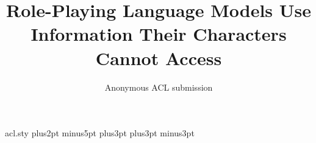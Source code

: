 \begin{filecontents*}{acl.sty}
\abovedisplayskip 7pt plus2pt minus5pt%
\belowdisplayskip \abovedisplayskip
\abovedisplayshortskip  0pt plus3pt%
\belowdisplayshortskip  4pt plus3pt minus3pt%

\def\@normalsize{\@setsize\normalsize{11pt}\xpt\@xpt}
\def\small{\@setsize\small{10pt}\ixpt\@ixpt}
\def\footnotesize{\@setsize\footnotesize{10pt}\ixpt\@ixpt}
\def\scriptsize{\@setsize\scriptsize{8pt}\viipt\@viipt}
\def\tiny{\@setsize\tiny{7pt}\vipt\@vipt}
\def\large{\@setsize\large{14pt}\xiipt\@xiipt}
\def\Large{\@setsize\Large{16pt}\xivpt\@xivpt}
\def\LARGE{\@setsize\LARGE{20pt}\xviipt\@xviipt}
\def\huge{\@setsize\huge{23pt}\xxpt\@xxpt}
\def\Huge{\@setsize\Huge{28pt}\xxvpt\@xxvpt}

\ifacl@hyperref
  \RequirePackage{hyperref}
  \hypersetup{colorlinks=true, citecolor=darkblue, linkcolor=darkblue, urlcolor=darkblue}
\else
  \def\href#1#2{{#2}}
  \usepackage{url}
\fi

\end{filecontents*}
\documentclass[11pt]{article}
\usepackage[review]{acl}
\usepackage{times,latexsym}
\usepackage[T1]{fontenc}
\usepackage[utf8]{inputenc}
\usepackage{microtype,booktabs,amsmath,amssymb,tabularx}
\usepackage{tikz}
\newsavebox{\OCtable}
\newsavebox{\OCfigure}
\newcommand{\HumanField}[1]{\ifcsname HV#1\endcsname\csname HV#1\endcsname\else\textcolor{OCblue}{\textbf{[#1]}}\fi}
\title{Role-Playing Language Models Use Information Their Characters Cannot Access}
\author{Anonymous ACL submission}


